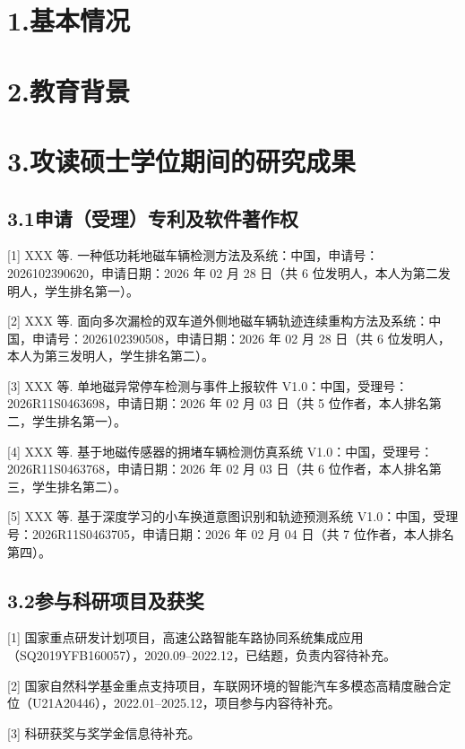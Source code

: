 
\section*{1.\quad 基本情况}

\section*{2.\quad 教育背景}

\section*{3.\quad 攻读硕士学位期间的研究成果}

\subsection*{3.1\quad 申请（受理）专利及软件著作权}

[1] XXX 等. 一种低功耗地磁车辆检测方法及系统：中国，申请号：2026102390620，申请日期：2026 年 02 月 28 日（共 6 位发明人，本人为第二发明人，学生排名第一）。

[2] XXX 等. 面向多次漏检的双车道外侧地磁车辆轨迹连续重构方法及系统：中国，申请号：2026102390508，申请日期：2026 年 02 月 28 日（共 6 位发明人，本人为第三发明人，学生排名第二）。

[3] XXX 等. 单地磁异常停车检测与事件上报软件 V1.0：中国，受理号：2026R11S0463698，申请日期：2026 年 02 月 03 日（共 5 位作者，本人排名第二，学生排名第一）。

[4] XXX 等. 基于地磁传感器的拥堵车辆检测仿真系统 V1.0：中国，受理号：2026R11S0463768，申请日期：2026 年 02 月 03 日（共 6 位作者，本人排名第三，学生排名第二）。

[5] XXX 等. 基于深度学习的小车换道意图识别和轨迹预测系统 V1.0：中国，受理号：2026R11S0463705，申请日期：2026 年 02 月 04 日（共 7 位作者，本人排名第四）。

\subsection*{3.2\quad 参与科研项目及获奖}

[1] 国家重点研发计划项目，高速公路智能车路协同系统集成应用（SQ2019YFB160057），2020.09--2022.12，已结题，负责内容待补充。

[2] 国家自然科学基金重点支持项目，车联网环境的智能汽车多模态高精度融合定位（U21A20446），2022.01--2025.12，项目参与内容待补充。

[3] 科研获奖与奖学金信息待补充。


